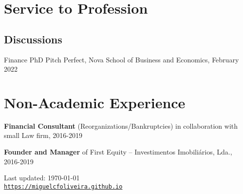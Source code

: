 \documentclass[letterpaper]{article}
\def\footerlink{https://miguelcfoliveira.github.io}
\renewenvironment{itemize}{
  \begin{list}{}{
    \setlength{\leftmargin}{1.5em}
  }
}{
  \end{list}
}
\begin{document}
\section*{Service to Profession}
\subsection*{Discussions}

\begin{itemize}
\item Finance PhD Pitch Perfect, Nova School of Business and Economics, February 2022
\end{itemize}

\section*{Non-Academic Experience}

\begin{itemize}
\item \textbf{Financial Consultant} (Reorganizations/Bankruptcies) in collaboration with small Law firm, 2016-2019
\item \textbf{Founder and Manager} of First Equity – Investimentos Imobiliários, Lda., 2016-2019
\end{itemize}




\bigskip

\begin{center}
  \begin{footnotesize}
    Last updated: \today \\
    \href{\footerlink}{\texttt{\footerlink}}
  \end{footnotesize}
\end{center}
\end{document}
